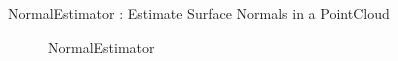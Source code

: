 \documentclass[main.tex]{subfiles}
\begin{document}
\begin{itemize}
    \begin{minipage}[t]{\textwidth}
    \item NormalEstimator : Estimate Surface Normals in a PointCloud 
        \begin{figure}[H]
                \centering
                \caption{NormalEstimator}
          \end{figure}
    \end{minipage}


\end{itemize}
\end{document}
